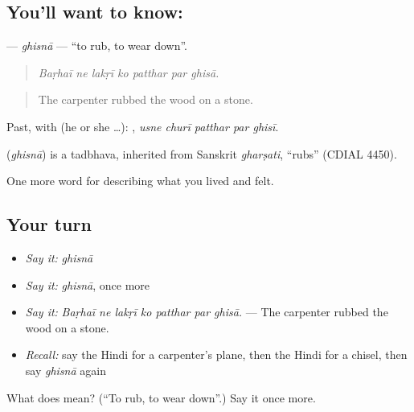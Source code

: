 \subsection*{You'll want to know: }
\textbf{} — \emph{ghisnā} — \textquotedblleft{}to rub, to wear down\textquotedblright{}.

\begin{quote}
      
\end{quote}

\begin{quote}
\emph{Baṛhaī ne lakṛī ko patthar par ghisā.}
\end{quote}

\begin{quote}
The carpenter rubbed the wood on a stone.
\end{quote}

Past, with  (he or she …):     , \emph{usne churī patthar par ghisī}.

\begin{cousinweb}
\textbf{} (\emph{ghisnā}) is a tadbhava, inherited from Sanskrit \emph{gharṣati}, \textquotedblleft{}rubs\textquotedblright{} (CDIAL 4450).
\end{cousinweb}

\begin{grammarlens}[title={What you've built}]
One more word for describing what you lived and felt.
\end{grammarlens}

\subsection*{Your turn}
\begin{itemize}
\raggedright
  \item \emph{Say it:} \emph{ghisnā}
  \item \emph{Say it:} \emph{ghisnā}, once more
  \item \emph{Say it:} \emph{Baṛhaī ne lakṛī ko patthar par ghisā.} — The carpenter rubbed the wood on a stone.
  \item \emph{Recall:} say the Hindi for a carpenter's plane, then the Hindi for a chisel, then say \emph{ghisnā} again
\end{itemize}

\begin{tcolorbox}[breakable,colback=teal!4,colframe=teal!35!black,title={Before you move on}]
What does  mean? (\textquotedblleft{}To rub, to wear down\textquotedblright{}.) Say it once more.
\end{tcolorbox}
